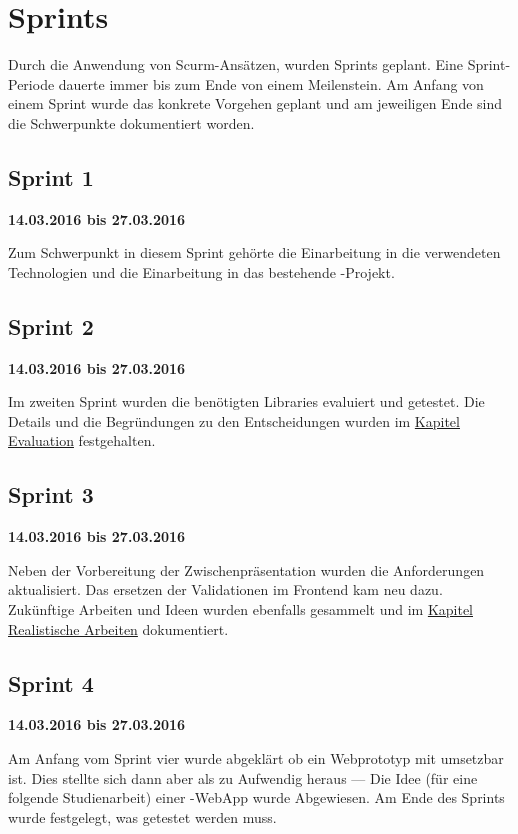 \section{Sprints}
Durch die Anwendung von Scurm-Ansätzen, wurden Sprints geplant. 
Eine Sprint-Periode dauerte immer bis zum Ende von einem Meilenstein. 
Am Anfang von einem Sprint wurde das konkrete Vorgehen geplant und am jeweiligen Ende sind die Schwerpunkte dokumentiert worden.


\subsection{Sprint 1}
\textbf{14.03.2016 bis 27.03.2016}

Zum Schwerpunkt in diesem Sprint gehörte die Einarbeitung in die verwendeten Technologien und die Einarbeitung in das bestehende \kort{}-Projekt.

\subsection{Sprint 2}
\textbf{14.03.2016 bis 27.03.2016}

Im zweiten Sprint wurden die benötigten Libraries evaluiert und getestet.
Die Details und die Begründungen zu den Entscheidungen wurden im \hyperref[tb-evaluation]{Kapitel Evaluation} festgehalten.

\subsection{Sprint 3}
\textbf{14.03.2016 bis 27.03.2016}

Neben der Vorbereitung der Zwischenpräsentation wurden die Anforderungen aktualisiert. 
Das ersetzen der Validationen im Frontend kam neu dazu. 
Zukünftige Arbeiten und Ideen wurden ebenfalls gesammelt und im \hyperref[pd-weiterentwicklung-realistisch]{Kapitel Realistische Arbeiten} dokumentiert.

\subsection{Sprint 4}
\textbf{14.03.2016 bis 27.03.2016}

Am Anfang vom Sprint vier wurde abgeklärt ob ein Webprototyp mit  umsetzbar ist. 
Dies stellte sich dann aber als zu Aufwendig heraus --- Die Idee (für eine folgende Studienarbeit) einer -\gls{WebApp} wurde Abgewiesen.
Am Ende des Sprints wurde festgelegt, was getestet werden muss.

